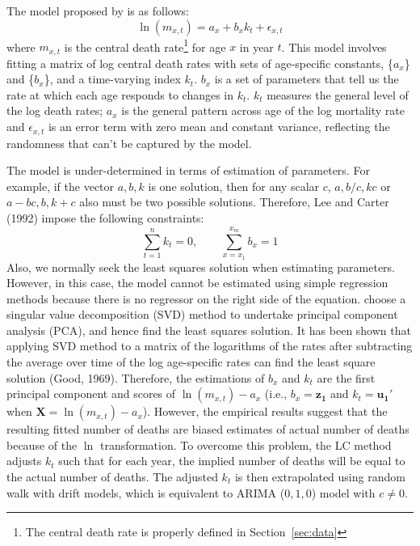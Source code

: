 \documentclass[11pt,a4paper,]{article}
\begin{document}
The model proposed by \textcite{LC92} is as follows:
\begin{equation}
  \ln(m_{x,t})=a_x+b_xk_t+\epsilon_{x,t}
\end{equation}
where \(m_{x,t}\) is the central death rate\footnote{The central death rate is properly defined in Section~\ref{sec:data}} for age \(x\) in year \(t\). This model involves fitting a matrix of log central death rates with sets of age-specific constants, \{\(a_x\)\} and \{\(b_x\)\}, and a time-varying index \(k_t\). \(b_x\) is a set of parameters that tell us the rate at which each age responds to changes in \(k_t\). \(k_t\) measures the general level of the log death rates; \(a_x\) is the general pattern across age of the log mortality rate and \(\epsilon_{x,t}\) is an error term with zero mean and constant variance, reflecting the randomness that can't be captured by the model.

The model is under-determined in terms of estimation of parameters. For example, if the vector \(a,b,k\) is one solution, then for any scalar \(c\), \(a, b/c, kc\) or \(a - bc, b, k+c\) also must be two possible solutions. Therefore, Lee and Carter (1992) impose the following constraints:
\begin{equation}
  \sum_{t=1}^{n}k_t=0, \qquad \sum_{x=x_1}^{x_m}b_x=1
\end{equation}
Also, we normally seek the least squares solution when estimating parameters. However, in this case, the model cannot be estimated using simple regression methods because there is no regressor on the right side of the equation. \textcite{LC92} choose a singular value decomposition (SVD) method to undertake principal component analysis (PCA), and hence find the least squares solution. It has been shown that applying SVD method to a matrix of the logarithms of the rates after subtracting the average over time of the log age-specific rates can find the least square solution (Good, 1969). Therefore, the estimations of \(b_x\) and \(k_t\) are the first principal component and scores of \(\ln(m_{x,t})-a_x\) (i.e., \(b_x=\bm{z_1}\) and \(k_t=\bm{u_1}'\) when \(\bm{X}=\ln(m_{x,t})-a_x\)). However, the empirical results suggest that the resulting fitted number of deaths are biased estimates of actual number of deaths because of the \(\ln\) transformation. To overcome this problem, the LC method adjusts \(k_t\) such that for each year, the implied number of deaths will be equal to the actual number of deaths. The adjusted \(k_t\) is then extrapolated using random walk with drift models, which is equivalent to ARIMA (\(0,1,0\)) model with \(c\neq0\).
\end{document}
